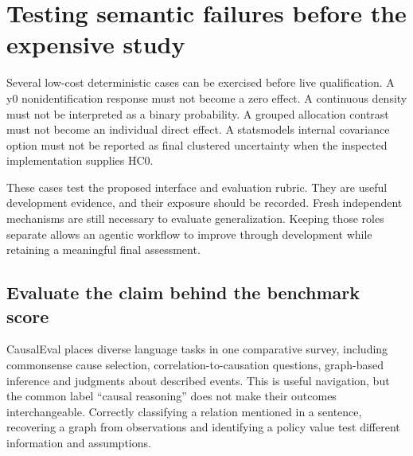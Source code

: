 \section{Testing semantic failures before the expensive study}

Several low-cost deterministic cases can be exercised before live qualification.
A y0 nonidentification response must not become a zero effect. A continuous
density must not be interpreted as a binary probability. A grouped allocation
contrast must not become an individual direct effect. A statsmodels internal
covariance option must not be reported as final clustered uncertainty when the
inspected implementation supplies HC0. \citep{v13_sw_y0,v13_sw_causalgps,v13_sw_inferference,v13_sw_statsmodels}

These cases test the proposed interface and evaluation rubric. They are useful
development evidence, and their exposure should be recorded. Fresh independent
mechanisms are still necessary to evaluate generalization. Keeping those roles
separate allows an agentic workflow to improve through development while
retaining a meaningful final assessment.


\hypertarget{evaluate-the-claim-behind-the-benchmark-score}{%
\subsection{Evaluate the claim behind the benchmark
score}\label{evaluate-the-claim-behind-the-benchmark-score}}

\label{exec13:census-evaluation}

CausalEval places diverse language tasks in one comparative survey,
including commonsense cause selection, correlation-to-causation
questions, graph-based inference and judgments about described events.
This is useful navigation, but the common label ``causal reasoning''
does not make their outcomes interchangeable. Correctly classifying a
relation mentioned in a sentence, recovering a graph from observations
and identifying a policy value test different information and
assumptions. \citep{exec13_census_causaleval}

